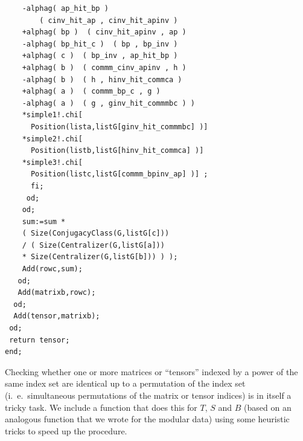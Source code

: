 \documentclass[a4paper, 10pt]{book}
\theoremstyle{definition}
\numberwithin{equation}{chapter}
\begin{document}
\begin{lstlisting}
	-alphag( ap_hit_bp )  
	    ( cinv_hit_ap , cinv_hit_apinv ) 
	+alphag( bp )  ( cinv_hit_apinv , ap ) 
	-alphag( bp_hit_c )  ( bp , bp_inv )  
	+alphag( c )  ( bp_inv , ap_hit_bp )  
	+alphag( b )  ( commm_cinv_apinv , h )  
	-alphag( b )  ( h , hinv_hit_commca )  
	+alphag( a )  ( commm_bp_c , g )  
	-alphag( a )  ( g , ginv_hit_commmbc ) ) 
	*simple1!.chi[ 
	  Position(lista,listG[ginv_hit_commmbc] )]   
	*simple2!.chi[ 
	  Position(listb,listG[hinv_hit_commca] )]  
	*simple3!.chi[ 
	  Position(listc,listG[commm_bpinv_ap] )] ;
      fi;
     od;
    od;
    sum:=sum * 
    ( Size(ConjugacyClass(G,listG[c])) 
    / ( Size(Centralizer(G,listG[a])) 
    * Size(Centralizer(G,listG[b])) ) );
    Add(rowc,sum);
   od;
   Add(matrixb,rowc);
  od;
  Add(tensor,matrixb);
 od;
 return tensor;
end;
\end{lstlisting}
Checking whether one or more matrices or ``tensors'' indexed by a power of the same index set are identical up to a permutation of the index set (i.~e.\ simultaneous permutations of the matrix or tensor indices) is in itself a tricky task. We include a function that does this for  $T$, $S$ and $B$ (based on an analogous function that we wrote for the modular data) using some heuristic tricks to speed up the procedure.
\end{document}
